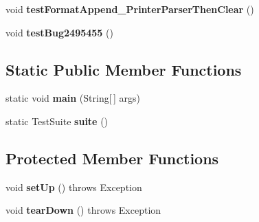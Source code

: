 \begin{DoxyCompactItemize}
\item 
\hypertarget{classorg_1_1joda_1_1time_1_1format_1_1_test_period_formatter_builder_a10609c6b4465b576d6668568b8d039f9}{void {\bfseries test\-Format\-Append\-\_\-\-Printer\-Parser\-Then\-Clear} ()}\label{classorg_1_1joda_1_1time_1_1format_1_1_test_period_formatter_builder_a10609c6b4465b576d6668568b8d039f9}

\item 
\hypertarget{classorg_1_1joda_1_1time_1_1format_1_1_test_period_formatter_builder_a6d0d00d2137e8672b4f5c901afade6e0}{void {\bfseries test\-Bug2495455} ()}\label{classorg_1_1joda_1_1time_1_1format_1_1_test_period_formatter_builder_a6d0d00d2137e8672b4f5c901afade6e0}

\end{DoxyCompactItemize}
\subsection*{Static Public Member Functions}
\begin{DoxyCompactItemize}
\item 
\hypertarget{classorg_1_1joda_1_1time_1_1format_1_1_test_period_formatter_builder_aab897908fe4597efe3a7d8e40e7ccf83}{static void {\bfseries main} (String\mbox{[}$\,$\mbox{]} args)}\label{classorg_1_1joda_1_1time_1_1format_1_1_test_period_formatter_builder_aab897908fe4597efe3a7d8e40e7ccf83}

\item 
\hypertarget{classorg_1_1joda_1_1time_1_1format_1_1_test_period_formatter_builder_a5f78db6f6fdad50ee375d28e239effe0}{static Test\-Suite {\bfseries suite} ()}\label{classorg_1_1joda_1_1time_1_1format_1_1_test_period_formatter_builder_a5f78db6f6fdad50ee375d28e239effe0}

\end{DoxyCompactItemize}
\subsection*{Protected Member Functions}
\begin{DoxyCompactItemize}
\item 
\hypertarget{classorg_1_1joda_1_1time_1_1format_1_1_test_period_formatter_builder_ac78388670447d94c4576d483578c71ec}{void {\bfseries set\-Up} ()  throws Exception }\label{classorg_1_1joda_1_1time_1_1format_1_1_test_period_formatter_builder_ac78388670447d94c4576d483578c71ec}

\item 
\hypertarget{classorg_1_1joda_1_1time_1_1format_1_1_test_period_formatter_builder_a48b6c0ec2aa3f02f20a73c4a42616c6d}{void {\bfseries tear\-Down} ()  throws Exception }\label{classorg_1_1joda_1_1time_1_1format_1_1_test_period_formatter_builder_a48b6c0ec2aa3f02f20a73c4a42616c6d}

\end{DoxyCompactItemize}



